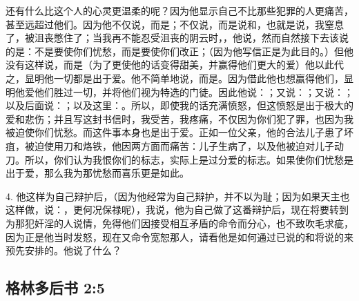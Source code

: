 \par

还有什么比这个人的心灵更温柔的呢？因为他显示自己不比那些犯罪的人更痛苦，甚至远超过他们。因为他不仅说，而是；不仅说，而是说和，也就是说，我窒息了，被沮丧憋住了；当我再不能忍受沮丧的阴云时，，他说，然而自然接下去该说的是：不是要使你们忧愁，而是要使你们改正；（因为他写信正是为此目的。）但他没有这样说，而是（为了更使他的话变得甜美，并赢得他们更大的爱）他以此代之，显明他一切都是出于爱。他不简单地说，而是。因为借此他也想赢得他们，显明他爱他们胜过一切，并将他们视为特选的门徒。因此他说：；又说：；又说：；以及后面说：；以及这里：。所以，即使我的话充满愤怒，但这愤怒是出于极大的爱和悲伤；并且写这封书信时，我受苦，我疼痛，不仅因为你们犯了罪，也因为我被迫使你们忧愁。而这件事本身也是出于爱。正如一位父亲，他的合法儿子患了坏疽，被迫使用刀和烙铁，他因两方面而痛苦：儿子生病了，以及他被迫对儿子动刀。所以，你们认为我恨你们的标志，实际上是过分爱的标志。如果使你们忧愁是出于爱，那么我为那忧愁而喜乐更是如此。\par

4. 他这样为自己辩护后，（因为他经常为自己辩护，并不以为耻；因为如果天主也这样做，说：，更何况保禄呢），我说，他为自己做了这番辩护后，现在将要转到为那犯奸淫的人说情，免得他们因接受相互矛盾的命令而分心，也不致吹毛求疵，因为正是他当时发怒，现在又命令宽恕那人，请看他是如何通过已说的和将说的来预先安排的。他说了什么？\par


\subsection{格林多后书 2:5}

\par


